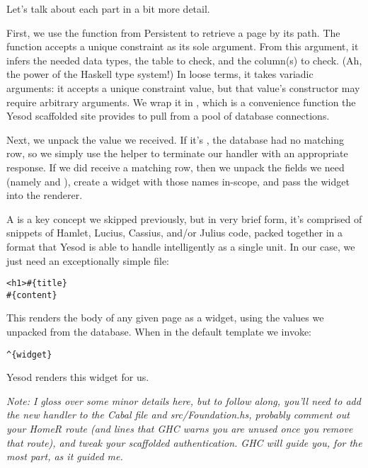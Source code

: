 Let's talk about each part in a bit more detail.

First, we use the  function from Persistent to retrieve a page by its path. The  function accepts a unique constraint as its sole argument. From this argument, it infers the needed data types, the table to check, and the column(s) to check. (Ah, the power of the Haskell type system!) In loose terms, it takes variadic arguments: it accepts a unique constraint value, but that value's constructor may require arbitrary arguments. We wrap it in , which is a convenience function the Yesod scaffolded site provides to pull from a pool of database connections.

Next, we unpack the  value we received. If it's , the database had no matching row, so we simply use the  helper to terminate our handler with an appropriate response. If we did receive a matching row, then we unpack the fields we need (namely  and ), create a widget with those names in-scope, and pass the widget into the  renderer.

A  is a key concept we skipped previously, but in very brief form, it's comprised of snippets of Hamlet, Lucius, Cassius, and/or Julius code, packed together in a format that Yesod is able to handle intelligently as a single unit. In our case, we just need an exceptionally simple  file:

\begin{Verbatim}[samepage=true]
<h1>#{title}
#{content}
\end{Verbatim}

This renders the body of any given page as a widget, using the values we unpacked from the database. When in the default template we invoke:

\begin{Verbatim}[samepage=true]
^{widget}
\end{Verbatim}

Yesod renders this widget for us.

\emph{Note: I gloss over some minor details here, but to follow along, you'll need to add the new handler to the Cabal file and src/Foundation.hs, probably comment out your HomeR route (and lines that GHC warns you are unused once you remove that route), and tweak your scaffolded authentication. GHC will guide you, for the most part, as it guided me.}


